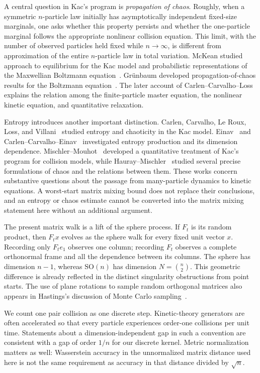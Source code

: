 \documentclass[11pt]{article}
\theoremstyle{definition}\newtheorem{definition}[theorem]{Definition}
\theoremstyle{remark}\newtheorem{remark}[theorem]{Remark}
\newcommand{\SO}{\mathrm{SO}}
\begin{document}
A central question in Kac's program is \emph{propagation of chaos}. Roughly, when a symmetric $n$-particle law initially has asymptotically independent fixed-size marginals, one asks whether this property persists and whether the one-particle marginal follows the appropriate nonlinear collision equation. This limit, with the number of observed particles held fixed while $n\to\infty$, is different from approximation of the entire $n$-particle law in total variation. McKean studied approach to equilibrium for the Kac model and probabilistic representations of the Maxwellian Boltzmann equation~\cite{McKean66,McKean67}. Gr\"unbaum developed propagation-of-chaos results for the Boltzmann equation~\cite{Grunbaum71}. The later account of Carlen--Carvalho--Loss~\cite{CCL11} explains the relation among the finite-particle master equation, the nonlinear kinetic equation, and quantitative relaxation.

Entropy introduces another important distinction. Carlen, Carvalho, Le Roux, Loss, and Villani~\cite{CCLRLV10} studied entropy and chaoticity in the Kac model. Einav~\cite{Einav11} and Carlen--Carvalho--Einav~\cite{CCE18} investigated entropy production and its dimension dependence. Mischler--Mouhot~\cite{MM13} developed a quantitative treatment of Kac's program for collision models, while Hauray--Mischler~\cite{HM14} studied several precise formulations of chaos and the relations between them. These works concern substantive questions about the passage from many-particle dynamics to kinetic equations. A worst-start matrix mixing bound does not replace their conclusions, and an entropy or chaos estimate cannot be converted into the matrix mixing statement here without an additional argument.

The present matrix walk is a lift of the sphere process. If $F_t$ is its random product, then $F_t x$ evolves as the sphere walk for every fixed unit vector $x$. Recording only $F_t e_1$ observes one column; recording $F_t$ observes a complete orthonormal frame and all the dependence between its columns. The sphere has dimension $n-1$, whereas $\SO(n)$ has dimension $N=\binom n2$. This geometric difference is already reflected in the distinct singularity obstructions from point starts. The use of plane rotations to sample random orthogonal matrices also appears in Hastings's discussion of Monte Carlo sampling~\cite{Hastings70}.

We count one pair collision as one discrete step. Kinetic-theory generators are often accelerated so that every particle experiences order-one collisions per unit time. Statements about a dimension-independent gap in such a convention are consistent with a gap of order $1/n$ for our discrete kernel. Metric normalization matters as well: Wasserstein accuracy in the unnormalized matrix distance used here is not the same requirement as accuracy in that distance divided by $\sqrt n$.
\end{document}

